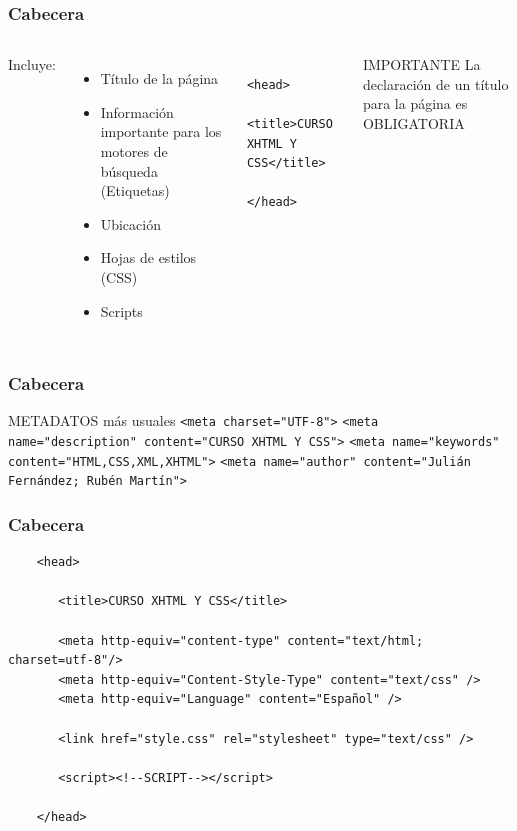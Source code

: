 \documentclass{beamer}
\begin{document}
\begin{frame}[fragile] %
\frametitle{Cabecera}
	\begin{columns}[c]
	Incluye:
	\begin{itemize}
	\item Título de la página
	\pause
	\item Información importante para los motores de búsqueda (Etiquetas)
	\pause
	\item Ubicación
	\pause
	\item Hojas de estilos (CSS)
	\pause
	\item Scripts
	\end{itemize}
	\pause
	\scriptsize{
		\begin{verbatim}
		<head>
		   <title>CURSO XHTML Y CSS</title>
		</head>
		\end{verbatim}
	}
	\pause
	\begin{alertblock}{IMPORTANTE}
	La declaración de un título para la página es OBLIGATORIA
	\end{alertblock}
	\end{columns}
\end{frame}

\begin{frame}[fragile] %
\frametitle{Cabecera}
	\begin{block}{METADATOS más usuales}
	\scriptsize{\verb|<meta charset="UTF-8">|}
	\scriptsize{\verb|<meta name="description" content="CURSO XHTML Y CSS">|}
	\scriptsize{\verb|<meta name="keywords" content="HTML,CSS,XML,XHTML">|}
	\scriptsize{\verb|<meta name="author" content="Julián Fernández; Rubén Martín">|}
	\end{block}
\end{frame}

\begin{frame}[fragile] %
\frametitle{Cabecera}
	\scriptsize{
	\begin{verbatim}
	<head>
	
	   <title>CURSO XHTML Y CSS</title>
	   
	   <meta http-equiv="content-type" content="text/html; charset=utf-8"/>
	   <meta http-equiv="Content-Style-Type" content="text/css" />
	   <meta http-equiv="Language" content="Español" />

	   <link href="style.css" rel="stylesheet" type="text/css" />

	   <script><!--SCRIPT--></script>

	</head>
	\end{verbatim}
	}
\end{frame}
\end{document}
